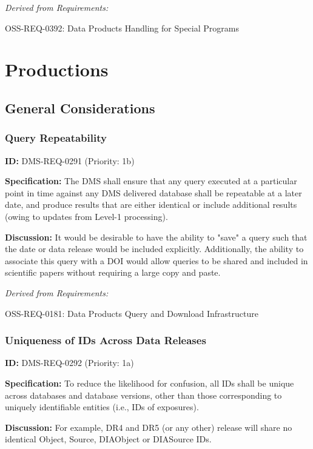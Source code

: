 \documentclass[SE,toc,lsstdraft]{lsstdoc}
\begin{document}
\emph{Derived from Requirements:}

OSS-REQ-0392:
Data Products Handling for Special Programs \newline

\section{Productions}

\subsection{General Considerations}

\subsubsection{Query Repeatability}

\label{DMS-REQ-0291}
\textbf{ID:} DMS-REQ-0291 (Priority: 1b)

\textbf{Specification:} The DMS shall ensure that any query executed at a particular point in time against any DMS delivered database shall be repeatable at a later date, and produce results that are either identical or include additional results (owing to updates from Level-1 processing).

\textbf{Discussion:} It would be desirable to have the ability to "save" a query such that the date or data release would be included explicitly. Additionally, the ability to associate this query with a DOI would allow queries to be shared and included in scientific papers without requiring a large copy and paste.

\emph{Derived from Requirements:}

OSS-REQ-0181:
Data Products Query and Download Infrastructure \newline

\subsubsection{Uniqueness of IDs Across Data Releases}

\label{DMS-REQ-0292}
\textbf{ID:} DMS-REQ-0292 (Priority: 1a)

\textbf{Specification:} To reduce the likelihood for confusion, all IDs shall be unique across databases and database versions, other than those corresponding to uniquely identifiable entities (i.e., IDs of exposures).

\textbf{Discussion:}
For example, DR4 and DR5 (or any other) release will share no identical Object, Source, DIAObject or DIASource IDs.
\end{document}
